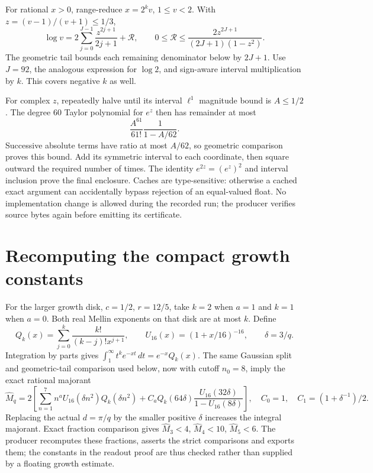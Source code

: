 \documentclass[11pt]{article}
\theoremstyle{definition}\newtheorem{definition}[theorem]{Definition}
\theoremstyle{remark}\newtheorem{remark}[theorem]{Remark}
\begin{document}
For rational $x>0$, range-reduce $x=2^kv$, $1\le v<2$. With
$z=(v-1)/(v+1)\le1/3$,
\[
 \log v=2\sum_{j=0}^{J-1}\frac{z^{2j+1}}{2j+1}+\mathcal R,
 \qquad 0\le\mathcal R\le
 \frac{2z^{2J+1}}{(2J+1)(1-z^2)}.
\]
The geometric tail bounds each remaining denominator below by $2J+1$.
Use $J=92$, the analogous expression for $\log2$, and sign-aware interval
multiplication by $k$. This covers negative $k$ as well.

For complex $z$, repeatedly halve until its interval $\ell^1$ magnitude
bound is $A\le1/2$. The degree $60$ Taylor polynomial for $e^z$ then has remainder
at most
\[
 \frac{A^{61}}{61!}\frac1{1-A/62}.
\]
Successive absolute terms have ratio at most $A/62$, so geometric comparison
proves this bound. Add its symmetric interval to each coordinate, then square
outward the required number of times. The identity $e^{2z}=(e^z)^2$ and
interval inclusion prove the final enclosure. Caches are type-sensitive:
otherwise a cached exact argument can accidentally bypass rejection of an
equal-valued float. No implementation change is allowed during the recorded run;
the producer verifies source bytes again before emitting its certificate.

\section{Recomputing the compact growth constants}
For the larger growth disk, $c=1/2$, $r=12/5$, take $k=2$ when $a=1$
and $k=1$ when $a=0$. Both real Mellin exponents on that disk are at most
$k$. Define
\[
 Q_k(x)=\sum_{j=0}^k\frac{k!}{(k-j)!x^{j+1}},\qquad
 U_{16}(x)=(1+x/16)^{-16},\qquad \delta=3/q.
\]
Integration by parts gives
$\int_1^\infty t^ke^{-xt}\,dt=e^{-x}Q_k(x)$.
The same Gaussian split and geometric-tail comparison used below, now
with cutoff $n_0=8$, imply the exact rational majorant
\[
 \widehat M_q=2\left[
 \sum_{n=1}^{7}n^aU_{16}(\delta n^2)Q_k(\delta n^2)
 +C_aQ_k(64\delta)\frac{U_{16}(32\delta)}{1-U_{16}(8\delta)}\right],
 \quad C_0=1,\quad C_1=(1+\delta^{-1})/2.
\]
Replacing the actual $d=\pi/q$ by the smaller positive $\delta$ increases
the integral majorant. Exact fraction comparison gives
$\widehat M_3<4$, $\widehat M_4<10$, $\widehat M_5<6$.
The producer recomputes these fractions, asserts the strict comparisons and
exports them; the constants in the readout proof are thus checked rather
than supplied by a floating growth estimate.
\end{document}
